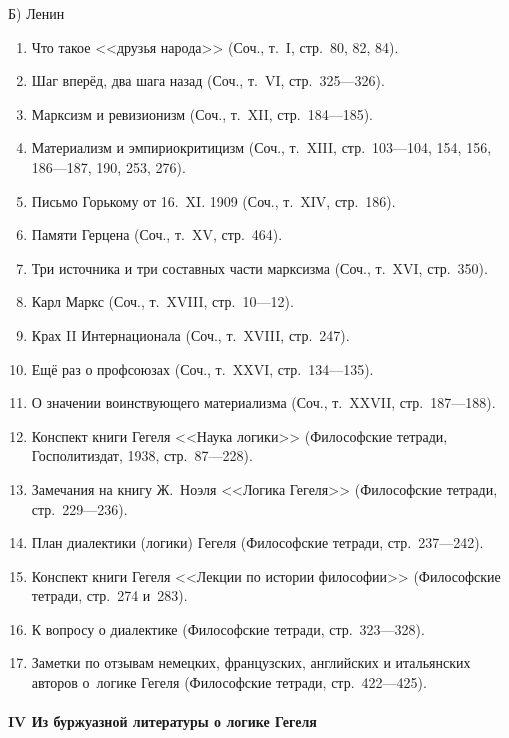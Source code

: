 {\centering Б) Ленин \par}

\begin{enumerate}
\item Что такое <<друзья народа>> (Соч., т.~I, стр.~80, 82, 84).
\item Шаг вперёд, два шага назад (Соч., т.~VI, стр.~325---326).
\item Марксизм и ревизионизм (Соч., т.~XII, стр.~184---185).
\item Материализм и эмпириокритицизм (Соч., т.~XIII, стр.~103---104, 154, 156,
186---187, 190, 253, 276).
\item Письмо Горькому от 16.~XI. 1909 (Соч., т.~XIV, стр.~186).
\item Памяти Герцена (Соч., т.~XV, стр.~464).
\item Три источника и три составных части марксизма (Соч., т.~XVI, стр.~350).
\item Карл Маркс (Соч., т.~XVIII, стр.~10---12).
\item Крах II Интернационала (Соч., т.~XVIII, стр.~247).
\item Ещё раз о профсоюзах (Соч., т.~XXVI, стр.~134---135).
\item О значении воинствующего материализма (Соч., т.~XXVII, стр.~187---188).
\item Конспект книги Гегеля <<Наука логики>> (Философские тетради,
Госполитиздат, 1938, стр.~87---228).
\item Замечания на книгу Ж.~Ноэля <<Логика Гегеля>> (Философские тетради,
стр.~229---236).
\item План диалектики (логики) Гегеля (Философские тетради, стр.~237---242).
\item Конспект книги Гегеля <<Лекции по истории философии>>
(Философские тетради, стр.~274 и~283).
\item К вопросу о диалектике (Философские тетради, стр.~323---328).
\item Заметки по отзывам немецких, французских, английских и итальянских
авторов о~логике Гегеля (Философские тетради, стр.~422---425).
\end{enumerate}

\paragraph%
[IV Из буржуазной литературы о логике Гегеля]%
{IV Из буржуазной литературы о логике Гегеля}

